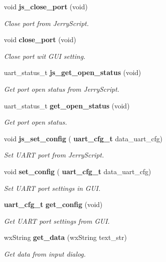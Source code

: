 \begin{DoxyCompactItemize}
void \textbf{ js\+\_\+close\+\_\+port} (void)
\begin{DoxyCompactList}\small\item\em Close port from Jerry\+Script. \end{DoxyCompactList}\item 
void \textbf{ close\+\_\+port} (void)
\begin{DoxyCompactList}\small\item\em Close port wit G\+UI setting. \end{DoxyCompactList}\item 
uart\+\_\+status\+\_\+t \textbf{ js\+\_\+get\+\_\+open\+\_\+status} (void)
\begin{DoxyCompactList}\small\item\em Get port open status from Jerry\+Script. \end{DoxyCompactList}\item 
uart\+\_\+status\+\_\+t \textbf{ get\+\_\+open\+\_\+status} (void)
\begin{DoxyCompactList}\small\item\em Get port open status. \end{DoxyCompactList}\item 
void \textbf{ js\+\_\+set\+\_\+config} (\textbf{ uart\+\_\+cfg\+\_\+t} data\+\_\+uart\+\_\+cfg)
\begin{DoxyCompactList}\small\item\em Set U\+A\+RT port from Jerry\+Script. \end{DoxyCompactList}\item 
void \textbf{ set\+\_\+config} (\textbf{ uart\+\_\+cfg\+\_\+t} data\+\_\+uart\+\_\+cfg)
\begin{DoxyCompactList}\small\item\em Set U\+A\+RT port settings in G\+UI. \end{DoxyCompactList}\item 
\textbf{ uart\+\_\+cfg\+\_\+t} \textbf{ get\+\_\+config} (void)
\begin{DoxyCompactList}\small\item\em Get U\+A\+RT port settings from G\+UI. \end{DoxyCompactList}\item 
wx\+String \textbf{ get\+\_\+data} (wx\+String text\+\_\+str)
\begin{DoxyCompactList}\small\item\em Get data from input dialog. \end{DoxyCompactList}\item 

\end{DoxyCompactItemize}
